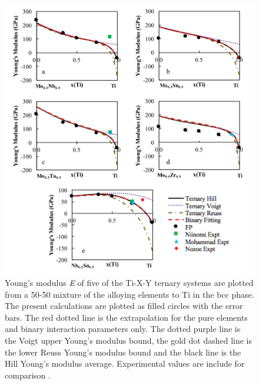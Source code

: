 \pagebreak
\begin{figure}[H]
	\centering
	\includegraphics[width=\textwidth]{Chapter-6/Figures/tixyyoungs1.png}
	\caption{Young's modulus \textit{E} of five of the Ti-X-Y ternary systems are plotted from a 50-50 mixture of the alloying elements to Ti in the bcc phase. The present calculations are plotted as filled circles with the error bars. The red dotted line is the extrapolation for the pure elements and binary interaction parameters only. The dotted purple line is the Voigt upper Young’s modulus bound, the gold dot dashed line is the lower Reuss Young’s modulus bound and the black line is the Hill Young’s modulus average. Experimental values are include for comparison \cite{Niinomi2012,Mohammed2014,Nozoe2007,Geetha2009}.}
	\label{Ch6-figure:tixyyoungs1}
\end{figure}

